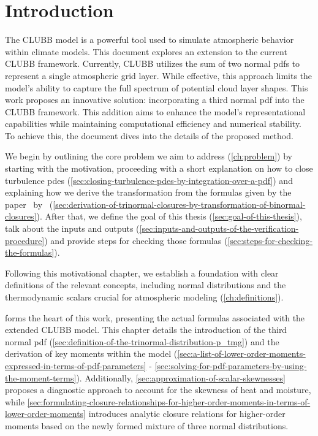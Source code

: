 \chapter{Introduction}\label{ch:introduction}

The \gls{CLUBB} model is a powerful tool used to simulate atmospheric behavior within climate models.
This document explores an extension to the current \gls{CLUBB} framework.
Currently, \gls{CLUBB} utilizes the sum of two normal \glspl{pdf}
to represent a single atmospheric grid layer.
While effective,
this approach limits the model's ability to capture the full spectrum of potential cloud layer shapes.
This work proposes an innovative solution:
incorporating a third normal \gls{pdf} into the \gls{CLUBB} framework.
This addition aims to enhance the model's representational capabilities
while maintaining computational efficiency and numerical stability.
To achieve this, the document dives into the details of the proposed method.

We begin by outlining the core problem we aim to address (\cref{ch:problem})
by starting with the motivation,
proceeding with a short explanation on how to close turbulence \glspl{pde}
(\cref{sec:closing-turbulence-pdes-by-integration-over-a-pdf})
and explaining how we derive the transformation from the formulas
given by the paper~ by~\citeauthor{larson2005using}
(\cref{sec:derivation-of-trinormal-closures-by-transformation-of-binormal-closures}).
After that, we define the goal of this thesis (\cref{sec:goal-of-this-thesis}),
talk about the inputs and outputs (\cref{sec:inputs-and-outputs-of-the-verification-procedure})
and provide steps for checking those formulas (\cref{sec:steps-for-checking-the-formulas}).

Following this motivational chapter,
we establish a foundation with clear definitions of the relevant concepts,
including normal distributions and the thermodynamic scalars
crucial for atmospheric modeling (\cref{ch:definitions}).

 forms the heart of this work,
presenting the actual formulas associated with the extended \gls{CLUBB} model.
This chapter details the introduction of the third normal \gls{pdf} (\cref{sec:definition-of-the-trinormal-distribution-p_tmg})
and the derivation of key moments within the model
(\cref{sec:a-list-of-lower-order-moments-expressed-in-terms-of-pdf-parameters} -
\cref{sec:solving-for-pdf-parameters-by-using-the-moment-terms}).
Additionally,
\cref{sec:approximation-of-scalar-skewnesses} proposes a diagnostic approach
to account for the skewness of heat and moisture,
while \cref{sec:formulating-closure-relationships-for-higher-order-moments-in-terms-of-lower-order-moments}
introduces analytic closure relations
for higher-order moments based on the newly formed mixture of three normal distributions.

